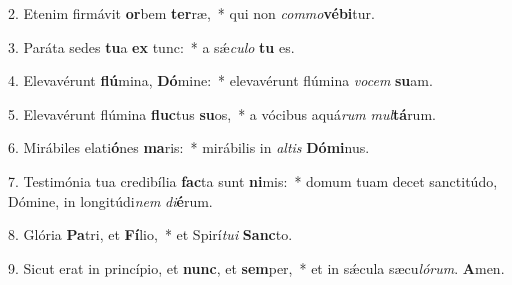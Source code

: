 2. Etenim firmávit \textbf{or}bem \textbf{ter}ræ,~*  qui non \textit{com}\textit{mo}\textbf{vé}\textbf{bi}tur.\

3. Paráta sedes \textbf{tu}a \textbf{ex} tunc:~*  a sǽ\textit{cu}\textit{lo} \textbf{tu} es.\

4. Elevavérunt \textbf{flú}mina, \textbf{Dó}mine:~*  elevavérunt flúmina \textit{vo}\textit{cem} \textbf{su}am.\

5. Elevavérunt flúmina \textbf{fluc}tus \textbf{su}os,~*  a vócibus aquá\textit{rum} \textit{mul}\textbf{tá}rum.\

6. Mirábiles elati\textbf{ó}nes \textbf{ma}ris:~*  mirábilis in \textit{al}\textit{tis} \textbf{Dó}\textbf{mi}nus.\

7. Testimónia tua credibília \textbf{fac}ta sunt \textbf{ni}mis:~*  domum tuam decet sanctitúdo, Dómine, in longitúdi\textit{nem} \textit{di}\textbf{é}rum.\

8. Glória \textbf{Pa}tri, et \textbf{Fí}lio,~*  et Spirí\textit{tu}\textit{i} \textbf{Sanc}to.\

9. Sicut erat in princípio, et \textbf{nunc}, et \textbf{sem}per,~*  et in sǽcula sæcu\textit{ló}\textit{rum}. \textbf{A}men.\

